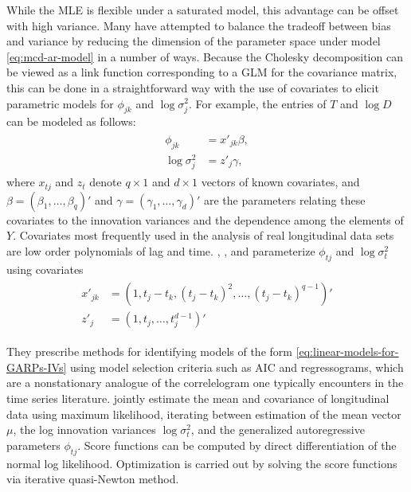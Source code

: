\bigskip

While the MLE is flexible under a saturated model, this advantage can be offset with high variance. Many have attempted to balance the tradeoff between bias and variance by reducing the dimension of the parameter space under model \eqref{eq:mcd-ar-model} in a number of ways. Because the Cholesky decomposition can be viewed as a link function corresponding to a GLM for the covariance matrix, this can be done in a straightforward way with the use of covariates to  elicit parametric models for $\phi_{jk}$ and $\log\sigma_j^2$.  For example, the entries of $T$ and $\log D$ can be modeled as follows:
\begin{align}
\begin{split} \label{eq:linear-models-for-GARPs-IVs}
\phi_{jk} &= x'_{jk} \beta,\\
\log\sigma_j^2 &= z'_j \gamma,
\end{split}
\end{align}
\noindent
where $x_{tj}$ and $z_{t}$ denote $q \times 1$ and $d \times 1$ vectors of known covariates, and $\beta = \left(\beta_1,\dots, \beta_q \right)'$ and $\gamma = \left(\gamma_1,\dots, \gamma_d \right)'$ are the parameters relating these covariates to the innovation variances and the dependence among the elements of $Y$. Covariates most frequently used in the analysis of real longitudinal data sets are low order polynomials of lag and time. \cite{pourahmadi1999joint}, \cite{pourahmadi2000maximum}, and \cite{pan2003modelling} parameterize $\phi_{tj}$ and $\log \sigma^2_t$ using covariates
\begin{align}
\begin{split}  \label{eq:GARP-IV-parametric-model}
x'_{jk} &= \left(1, t_j - t_k, \left(t_j - t_k\right)^2,\dots, \left(t_j - t_k\right)^{q-1}\right)' \\
z'_{j}  &= \left(1, t_j, \dots, t_j^{d-1}\right)'
\end{split}
\end{align}

They prescribe methods for identifying models of the form \eqref{eq:linear-models-for-GARPs-IVs} using model selection criteria such as AIC and regressograms, which are a nonstationary analogue of the correlelogram one typically encounters in the time series literature. \cite{pan2003modelling} jointly estimate the mean and covariance of longitudinal data using maximum likelihood, iterating between estimation of the mean vector $\mu$, the log innovation variances $\log \sigma_{t}^2$, and the generalized autoregressive parameters $\phi_{tj}$. Score functions can be computed by direct differentiation of the normal log likelihood. Optimization is carried out by solving the score functions via iterative quasi-Newton method. 

